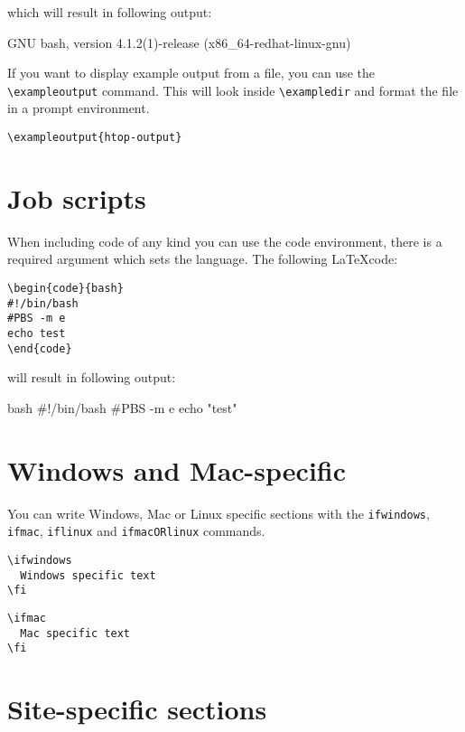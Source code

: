 \documentclass[11pt,a4paper]{article}
\begin{document}
which will result in following output:

\begin{prompt}
GNU bash, version 4.1.2(1)-release (x86_64-redhat-linux-gnu)
\end{prompt}

If you want to display example output from a file, you can use the
\verb|\exampleoutput| command. This will look inside \verb|\exampledir| and
format the file in a prompt environment.

\begin{verbatim}
\exampleoutput{htop-output}
\end{verbatim}

\section{Job scripts}
\label{sec:job-scripts}

When including code of any kind you can use the code environment, there is a
required argument which sets the language. The following \LaTeX code:

\begin{verbatim}
\begin{code}{bash}
#!/bin/bash
#PBS -m e
echo test
\end{code}
\end{verbatim}

will result in following output:

\begin{code}{bash}
#!/bin/bash
#PBS -m e
echo "test"
\end{code}

\section{Windows and Mac-specific}
\label{sec:windows-and-mac-specific}

You can write Windows, Mac or Linux specific sections with the \texttt{ifwindows}, \texttt{ifmac}, \texttt{iflinux} and
\texttt{ifmacORlinux} commands.

\begin{verbatim}
\ifwindows
  Windows specific text
\fi
\end{verbatim}

\begin{verbatim}
\ifmac
  Mac specific text
\fi
\end{verbatim}


\section{Site-specific sections}
\label{sec:site-specific-sections}
\end{document}
